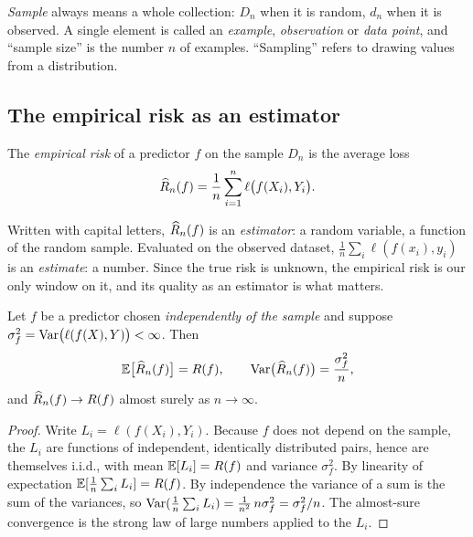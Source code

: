 \begin{notechapter}
\begin{keyidea}
\emph{Sample} always means a whole collection: $D_n$ when it is random, $d_n$
when it is observed. A single element is called an \emph{example},
\emph{observation} or \emph{data point}, and ``sample size'' is the number
$n$ of examples. ``Sampling'' refers to drawing values from a distribution.
\end{keyidea}

\subsection{The empirical risk as an estimator}

\begin{definition}\label{learning-problem:def:emprisk}
The \emph{empirical risk} of a predictor $f$ on the sample $D_n$ is the average
loss
\[
  \widehat{R}_n(f) = \frac1n \sum_{i=1}^n \ell\bigl(f(X_i), Y_i\bigr).
\]
\end{definition}

Written with capital letters, $\widehat{R}_n(f)$ is an \emph{estimator}: a random
variable, a function of the random sample. Evaluated on the observed dataset,
$\frac1n\sum_i \ell(f(x_i),y_i)$ is an \emph{estimate}: a number. Since
the true risk is unknown, the empirical risk is our only window on it, and its
quality as an estimator is what matters.

\begin{proposition}\label{learning-problem:prop:unbiased}
Let $f$ be a predictor chosen \emph{independently of the sample} and suppose
$\sigma_f^2 = \operatorname{Var}\bigl(\ell(f(X),Y)\bigr) < \infty$. Then
\[
  \mathbb{E}\bigl[\widehat{R}_n(f)\bigr] = R(f), \qquad
  \operatorname{Var}\bigl(\widehat{R}_n(f)\bigr) = \frac{\sigma_f^2}{n},
\]
and $\widehat{R}_n(f) \to R(f)$ almost surely as $n \to \infty$.
\end{proposition}

\begin{proof}
Write $L_i = \ell(f(X_i), Y_i)$. Because $f$ does not depend on the sample, the
$L_i$ are functions of independent, identically distributed pairs, hence are
themselves i.i.d., with mean $\mathbb{E}[L_i] = R(f)$ and variance $\sigma_f^2$.
By linearity of expectation $\mathbb{E}[\frac1n \sum_i L_i] = R(f)$. By
independence the variance of a sum is the sum of the variances, so
$\operatorname{Var}(\frac1n\sum_i L_i) = \frac1{n^2}\, n \sigma_f^2 = \sigma_f^2 / n$. The
almost-sure convergence is the strong law of large numbers applied to the
$L_i$.
\end{proof}


\end{notechapter}
